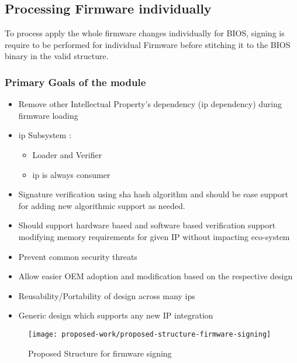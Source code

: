 \subsection{Processing Firmware individually}\label{subsection-processing-firmware}
To process apply the whole firmware changes individually for BIOS, signing is require to be performed for individual Firmware before stitching it to the BIOS binary in the valid structure.

\subsubsection{Primary Goals of the module}
\begin{itemize}
	\item Remove other Intellectual Property's dependency (\gls{ip} dependency) during firmware loading
	\item \gls{ip} Subsystem :
		\begin{itemize}
			\item Loader and Verifier
			\item \gls{ip} is always consumer
		\end{itemize}
	\item Signature verification using \gls{sha} hash algorithm and should be ease support for adding new algorithmic support as needed.
	\item Should support hardware based and software based verification support
	modifying memory requirements for given IP without impacting eco-system
	\item Prevent common security threats
	\item Allow easier OEM adoption and modification based on the respective design
	\item Reusability/Portability of design across many \gls{ip}s
	\item Generic design which supports any new IP integration
\end{itemize}

\begin{figure}[!htbp]
	\centering
	\texttt{[image: proposed-work/proposed-structure-firmware-signing]}
	\caption{Proposed Structure for firmware signing}\label{fig:proposed-work-proposed-structure-firmware-signing}
\end{figure}
